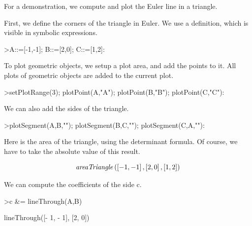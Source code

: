 \documentclass[a4paper,10pt]{article}
\begin{document}
\begin{eulernotebook}
\begin{eulercomment}
\begin{eulercomment}
\begin{eulercomment}
For a demonstration, we compute and plot the Euler line in a triangle.

First, we define the corners of the triangle in Euler. We use a definition, which is visible
in symbolic expressions.
\end{eulercomment}
\begin{eulerprompt}
>A::=[-1,-1]; B::=[2,0]; C::=[1,2]:
\end{eulerprompt}
\begin{eulercomment}
To plot geometric objects, we setup a plot area, and add the points to
it. All plots of geometric objects are added to the current plot.
\end{eulercomment}
\begin{eulerprompt}
>setPlotRange(3); plotPoint(A,"A"); plotPoint(B,"B"); plotPoint(C,"C"):
\end{eulerprompt}
\begin{eulercomment}
We can also add the sides of the triangle.
\end{eulercomment}
\begin{eulerprompt}
>plotSegment(A,B,""); plotSegment(B,C,""); plotSegment(C,A,""):
\end{eulerprompt}
\begin{eulercomment}
Here is the area of the triangle, using the determinant formula. Of
course, we have to take the absolute value of this result.
\end{eulercomment}
\begin{eulerformula}
\[
{\it areaTriangle}\left(\left[ -1 , -1 \right]  , \left[ 2 , 0
  \right]  , \left[ 1 , 2 \right] \right)
\]
\end{eulerformula}
\begin{eulercomment}
We can compute the coefficients of the side c.
\end{eulercomment}
\begin{eulerprompt}
>c &= lineThrough(A,B)
\end{eulerprompt}
\begin{euleroutput}
  
                     lineThrough([- 1, - 1], [2, 0])
  

\end{euleroutput}
\end{eulercomment}
\end{eulercomment}
\end{eulernotebook}
\end{document}
